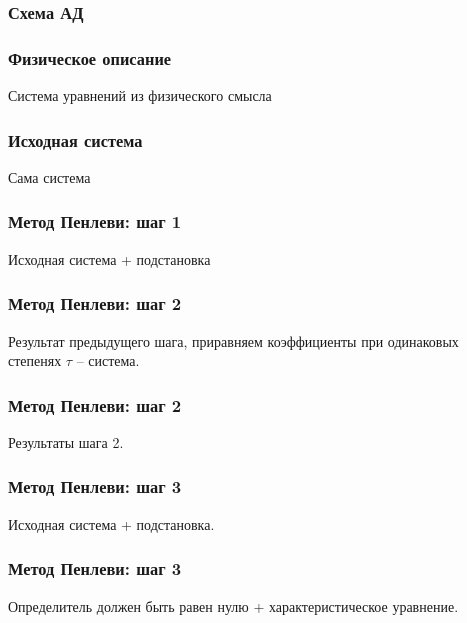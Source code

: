 \documentclass[14pt]{beamer}
\begin{document}
\begin{frame}
\frametitle{Схема АД}

\end{frame}


\begin{frame}

\frametitle{Физическое описание}

Система уравнений из физического смысла

\end{frame}


\begin{frame}

\frametitle{Исходная система}

Сама система

\end{frame}



\begin{frame}

\frametitle{Метод Пенлеви: шаг 1}

Исходная система + подстановка

\end{frame}



\begin{frame}

\frametitle{Метод Пенлеви: шаг 2}

Результат предыдущего шага, приравняем коэффициенты при одинаковых степенях $ \tau $ -- система.

\end{frame}

\begin{frame}

\frametitle{Метод Пенлеви: шаг 2}

Результаты шага 2.

\end{frame}



\begin{frame}

\frametitle{Метод Пенлеви: шаг 3}

Исходная система + подстановка.

\end{frame}



\begin{frame}

\frametitle{Метод Пенлеви: шаг 3}

Определитель должен быть равен нулю + характеристическое уравнение.

\end{frame}
\end{document}
